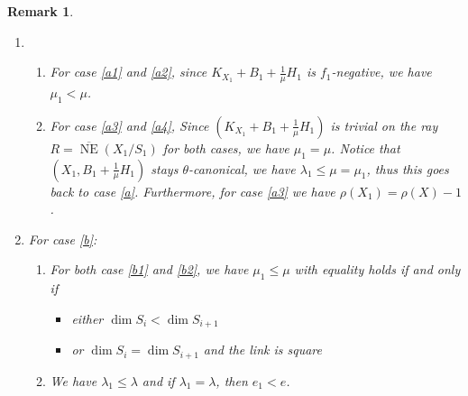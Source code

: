 \documentclass{article}
\newtheorem{rmk}[defn]{Remark}
\begin{document}
\begin{rmk}
  
\begin{enumerate}
  \item 
  \begin{enumerate}
    \item For case \ref{a1} and \ref{a2},  since $ K_{X_1}+B_1+\frac{1}{\mu}H_1 $ is $ f_1 $-negative, we have    $\mu_1<\mu$.
    \item For case \ref{a3} and \ref{a4}, Since $ (K_{X_1}+B_1+\frac{1}{\mu}H_1) $ is trivial on the ray $ R=\overline{\operatorname{NE}}(X_1/S_1) $ for both cases, we have $\mu_1=\mu$.
      Notice that $ (X_1,B_1+\frac{1}{\mu}H_1) $ stays $ \theta $-canonical, we have $\lambda_1\leqslant \mu=\mu_1$, thus this goes back to case \ref{a}. Furthermore,   for case \ref{a3} we have $\rho(X_1)=\rho(X)-1$.
  \end{enumerate} 
\item For case \ref{b}: 
  \begin{enumerate}
    \item For both case \ref{b1} and \ref{b2}, we have   $\mu_1\leqslant \mu$
    with equality holds if and only if 
    \begin{itemize}
      \item 
        either $\dim S_i<\dim S_{i+1} $
        \item  
        or $\dim S_i=\dim S_{i+1}$ and the link is square 
    \end{itemize}
  \item We have  $\lambda_1\leqslant \lambda$ and if $ \lambda_1=\lambda $, then   $e_1<e$.
  \end{enumerate} 
\end{enumerate}
\end{rmk}
\end{document}
